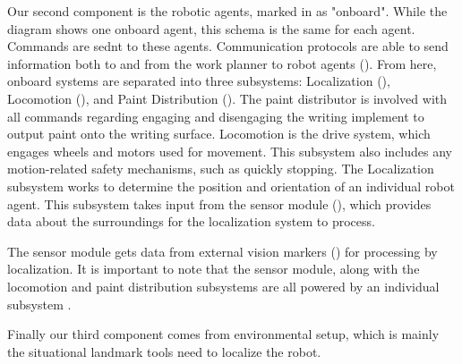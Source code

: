 Our second component is the robotic agents, marked in  as "onboard". While the diagram shows one onboard agent, this schema is the same for each agent. Commands are sednt to these agents.  Communication protocols are able to send information both to and from the work planner to robot agents (). From here, onboard systems are separated into three subsystems: Localization (), Locomotion (), and Paint Distribution (). The paint distributor is involved with all commands regarding engaging and disengaging the writing implement to output paint onto the writing surface. Locomotion is the drive system, which engages wheels and motors used for movement. This subsystem also includes any motion-related safety mechanisms, such as quickly stopping. The Localization subsystem works to determine the position and orientation of an individual robot agent. This subsystem takes input from the sensor module (), which provides data about the surroundings for the localization system to process.

The sensor module gets data from external vision markers () for processing by localization. It is important to note that the sensor module, along with the locomotion and paint distribution subsystems are all powered by an individual subsystem .

Finally our third component comes from environmental setup, which is mainly the situational landmark tools need to localize the robot.  